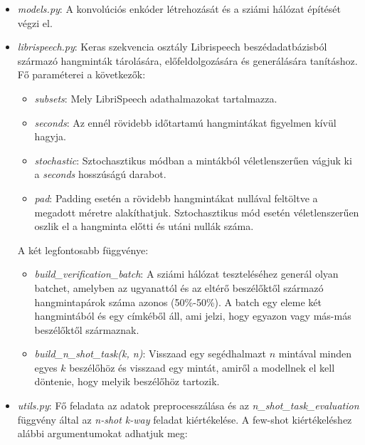 \begin{itemize}
	\item \emph{models.py}: A konvolúciós enkóder létrehozását és a sziámi hálózat építését végzi el.
	\item \emph{librispeech.py}: Keras szekvencia osztály Librispeech beszédadatbázisból származó hangminták tárolására, előfeldolgozására és generálására tanításhoz. Fő paraméterei a következők:
	\begin{itemize}
		\item \emph{subsets}: Mely LibriSpeech adathalmazokat tartalmazza.
		\item \emph{seconds}: Az ennél rövidebb időtartamú hangmintákat figyelmen kívül hagyja.
		\item \emph{stochastic}: Sztochasztikus módban a mintákból véletlenszerűen vágjuk ki a \emph{seconds} hosszúságú darabot.
		\item \emph{pad}: Padding esetén a rövidebb hangmintákat nullával feltöltve a megadott méretre alakíthatjuk. Sztochasztikus mód esetén véletlenszerűen oszlik el a hangminta előtti és utáni nullák száma.
	\end{itemize}
	
	A két legfontosabb függvénye:
	
	\begin{itemize}
		\item \emph{build\_verification\_batch}: A sziámi hálózat teszteléséhez generál olyan batchet, amelyben az ugyanattól és az eltérő beszélőktől származó hangmintapárok száma azonos (50\%-50\%). A batch egy eleme két hangmintából és egy címkéből áll, ami jelzi, hogy egyazon vagy más-más beszélőktől származnak.
		\item \emph{build\_n\_shot\_task(k, n)}: Visszaad egy segédhalmazt $n$ mintával minden egyes $k$ beszélőhöz és visszaad egy mintát, amiről a modellnek el kell döntenie, hogy melyik beszélőhöz tartozik.
	\end{itemize}
	\item \emph{utils.py}: Fő feladata az adatok preprocesszálása és az \emph{n\_shot\_task\_evaluation} függvény által az \emph{n-shot k-way} feladat kiértékelése. A few-shot kiértékeléshez alábbi argumentumokat adhatjuk meg:
	

\end{itemize}
